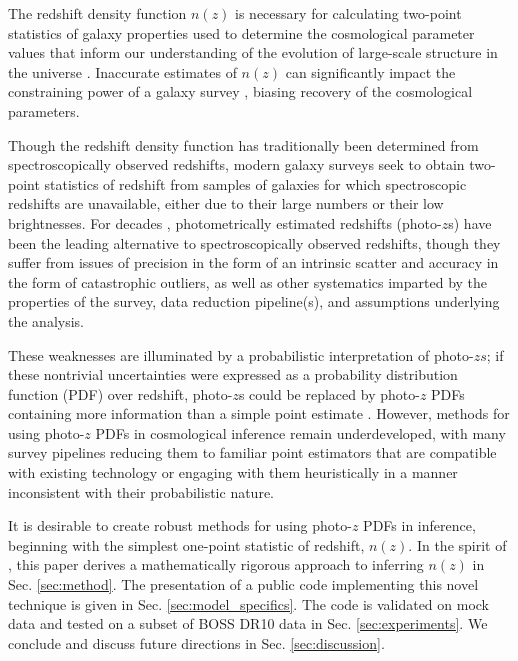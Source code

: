 \documentclass[preprint]{aastex}
\begin{document}
The redshift density function $n(z)$ is necessary for calculating two-point statistics of galaxy properties used to determine the cosmological parameter values that inform our understanding of the evolution of large-scale structure in the universe \citep{masters_mapping_2015}.  Inaccurate estimates of $n(z)$ can significantly impact the constraining power of a galaxy survey \citep{hildebrandt_kids-450:_2016}, biasing recovery of the cosmological parameters.  

Though the redshift density function has traditionally been determined from spectroscopically observed redshifts, modern galaxy surveys seek to obtain two-point statistics of redshift from samples of galaxies for which spectroscopic redshifts are unavailable, either due to their large numbers or their low brightnesses.  For decades \citep{baum_photoelectric_1962}, photometrically estimated redshifts (photo-$z$s) have been the leading alternative to spectroscopically observed redshifts, though they suffer from issues of precision in the form of an intrinsic scatter and accuracy in the form of catastrophic outliers, as well as other systematics imparted by the properties of the survey, data reduction pipeline(s), and assumptions underlying the analysis.  

These weaknesses are illuminated by a probabilistic interpretation of photo-$zs$; if these nontrivial uncertainties were expressed as a probability distribution function (PDF) over redshift, photo-$z$s could be replaced by photo-$z$ PDFs containing more information than a simple point estimate \citep{koo_overview_1999}.  However, methods for using photo-$z$ PDFs in cosmological inference remain underdeveloped, with many survey pipelines reducing them to familiar point estimators that are compatible with existing technology or engaging with them heuristically in a manner inconsistent with their probabilistic nature.

It is desirable to create robust methods for using photo-$z$ PDFs in inference, beginning with the simplest one-point statistic of redshift, $n(z)$.  In the spirit of \citet{hogg_inferring_2010, foreman-mackey_exoplanet_2014}, this paper derives a mathematically rigorous approach to inferring $n(z)$ in Sec. \ref{sec:method}.  The presentation of a public code implementing this novel technique is given in Sec. \ref{sec:model_specifics}.  The code is validated on mock data and tested on a subset of BOSS DR10 data in Sec. \ref{sec:experiments}.  We conclude and discuss future directions in Sec. \ref{sec:discussion}.
\end{document}
